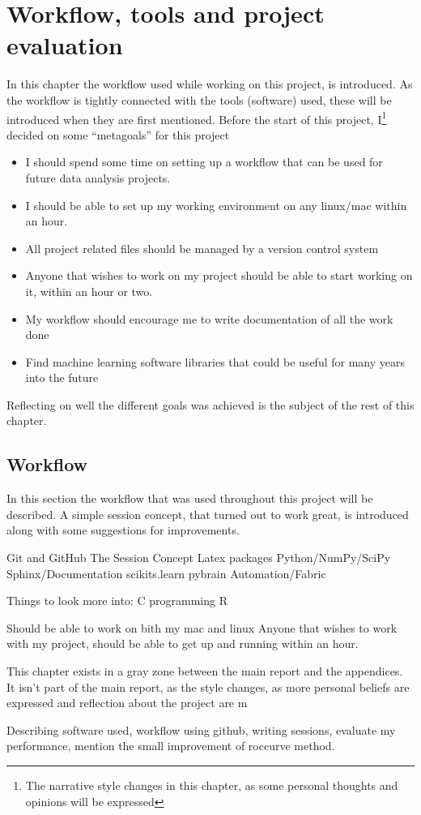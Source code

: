 \chapter{Workflow, tools and project evaluation}\label{chp:tools}
In this chapter the workflow used while working on this project, is introduced. As the workflow is tightly connected with the tools (software) used, these will be introduced when they are first mentioned. Before the start of this project, I\footnote{The narrative style changes in this chapter, as some personal thoughts and opinions will be expressed} decided on some ``metagoals'' for this project
\begin{itemize}
    \item I should spend some time on setting up a workflow that can be used for future data analysis projects.
    \item I should be able to set up my working environment on any linux/mac within an hour.
    \item All project related files should be managed by a version control system
    \item Anyone that wishes to work on my project should be able to start working on it, within an hour or two.
    \item My workflow should encourage me to write documentation of all the work done
    \item Find machine learning software libraries that could be useful for many years into the future
\end{itemize}
Reflecting on well the different goals was achieved is the subject of the rest of this chapter.


\section{Workflow}
In this section the workflow that was used throughout this project will be described. A simple session concept, that turned out to work great, is introduced along with some suggestions for improvements.


Git and GitHub
The Session Concept
Latex packages
Python/NumPy/SciPy
Sphinx/Documentation
scikits.learn
pybrain
Automation/Fabric

Things to look more into:
C programming
R


Should be able to work on bith my mac and linux
Anyone that wishes to work with my project, should be able to get up and running within an hour.



This chapter exists in a gray zone between the main report and the appendices. It isn't part of the main report, as the style changes, as more personal beliefs are expressed and reflection about the project are m


Describing software used, workflow using github, writing sessions, evaluate my performance, mention the small improvement of roccurve method.
